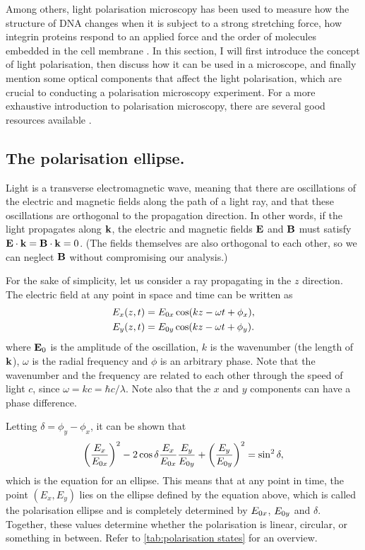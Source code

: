 Among others, light polarisation microscopy has been used to measure how the structure of DNA changes when it is subject to a strong stretching force, how integrin proteins respond to an applied force and the order of molecules embedded in the cell membrane \cite{Backer2019, Nordenfelt2017, Swaminathan2017, Brasselet2013}. In this section, I will first introduce the concept of light polarisation, then discuss how it can be used in a microscope, and finally mention some optical components that affect the light polarisation, which are crucial to conducting a polarisation microscopy experiment. For a more exhaustive introduction to polarisation microscopy, there are several good resources available \cite{Goldstein2011, Collett2005, Lakowicz2006}.

\subsection{The polarisation ellipse.} Light is a transverse electromagnetic wave, meaning that there are oscillations of the electric and magnetic fields along the path of a light ray, and that these oscillations are orthogonal to the propagation direction. In other words, if the light propagates along $\vb{k}$, the electric and magnetic fields $\vb{E}$ and $\vb{B}$ must satisfy $ \vb{E} \cdot \vb{k} = \vb{B} \cdot \vb{k} = 0$. (The fields themselves are also orthogonal to each other, so we can neglect $ \vb{B} $ without compromising our analysis.)

For the sake of simplicity, let us consider a ray propagating in the $ z $ direction. The electric field at any point in space and time can be written as
\begin{align}
	E_x(z, t) &= E_{0x} \cos(kz-\omega t + \phi_x),\\
	E_y(z, t) &= E_{0y} \cos(kz-\omega t + \phi_y).
\end{align}
where $ \vb{E}_0 $ is the amplitude of the oscillation, $ k $ is the wavenumber (the length of $ \vb{k} $), $ \omega $ is the radial frequency and $ \phi $ is an arbitrary phase. Note that the wavenumber and the frequency are related to each other through the speed of light $ c $, since $ \omega = kc = \hbar c/\lambda$. Note also that the $ x $ and $ y $ components can have a phase difference.

Letting $ \delta = \phi_y-\phi_x $, it can be shown that 
\begin{equation}
	\left(\frac{E_x}{E_{0x}}\right)^2 - 2\cos\delta\frac{E_x}{E_{0x}}\frac{E_y}{E_{0y}} + \left(\frac{E_y}{E_{0y}}\right)^2 = \sin^2\delta,
\end{equation}
which is the equation for an ellipse. This means that at any point in time, the point $ (E_x, E_y) $ lies on the ellipse defined by the equation above, which is called the polarisation ellipse and is completely determined by $ E_{0x} $, $ E_{0y} $ and $ \delta $. Together, these values determine whether the polarisation is linear, circular, or something in between. Refer to \autoref{tab:polarisation states} for an overview.

